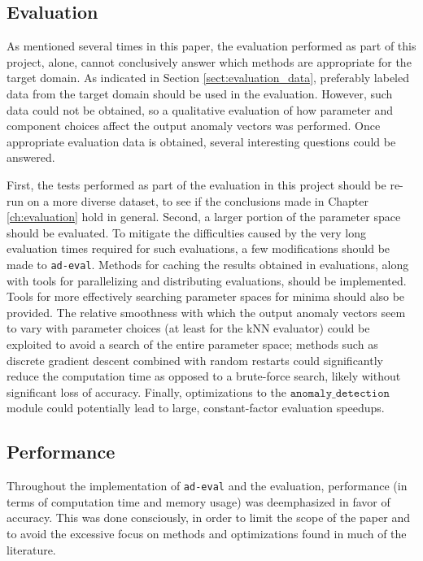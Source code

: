 \subsection{Evaluation}

As mentioned several times in this paper, the evaluation performed as part of this project, alone, cannot conclusively answer which methods are appropriate for the target domain. As indicated in Section \ref{sect:evaluation_data}, preferably labeled data from the target domain should be used in the evaluation. However, such data could not be obtained, so a qualitative evaluation of how parameter and component choices affect the output anomaly vectors was performed. Once appropriate evaluation data is obtained, several interesting questions could be answered.

First, the tests performed as part of the evaluation in this project should be re-run on a more diverse dataset, to see if the conclusions made in Chapter \ref{ch:evaluation} hold in general. Second, a larger portion of the parameter space should be evaluated. To mitigate the difficulties caused by the very long evaluation times required for such evaluations, a few modifications should be made to \texttt{ad-eval}. Methods for caching the results obtained in evaluations, along with tools for parallelizing and distributing evaluations, should be implemented. Tools for more effectively searching parameter spaces for minima should also be provided. The relative smoothness with which the output anomaly vectors seem to vary with parameter choices (at least for the kNN evaluator) could be exploited to avoid a search of the entire parameter space; methods such as discrete gradient descent combined with random restarts could significantly reduce the computation time as opposed to a brute-force search, likely without significant loss of accuracy. Finally, optimizations to the $\texttt{anomaly\_detection}$ module could potentially lead to large, constant-factor evaluation speedups.

\subsection{Performance}

Throughout the implementation of \texttt{ad-eval} and the evaluation, performance (in terms of computation time and memory usage) was deemphasized in favor of accuracy. This was done consciously, in order to limit the scope of the paper and to avoid the excessive focus on methods and optimizations found in much of the literature.

